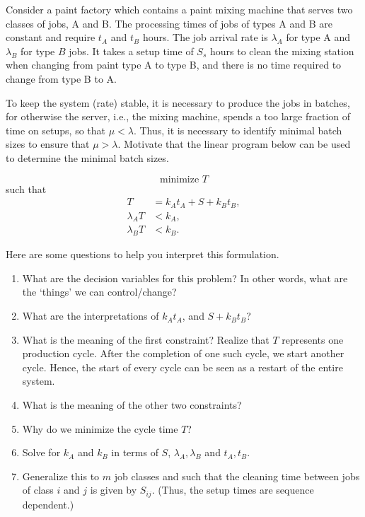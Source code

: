 \begin{question}
  Consider a paint factory which contains a paint mixing machine that
  serves two classes of jobs, A and B. The processing times of jobs of
  types A and B are constant and require $t_A$ and $t_B$ hours. The
  job arrival rate is $\lambda_A$ for type A and $\lambda_B$ for type
  $B$ jobs. It takes a setup time of $S_s$ hours to clean the mixing
  station when changing from paint type A to type B, and there is no
  time required to change from type B to A.

  To keep the system (rate) stable, it is necessary to produce the
  jobs in batches, for otherwise the server, i.e., the mixing machine,
  spends a too large fraction of time on setups, so that
  $\mu < \lambda$. Thus, it is necessary to identify minimal batch
  sizes to ensure that $\mu > \lambda$.  Motivate that the linear
  program below can be used to determine the minimal batch sizes.

\begin{equation*}
  \text{minimize }  T
\end{equation*}
such that
\begin{align*}
 T&=  k_A t_A + S + k_B t_B, \\
 \lambda_A T &< k_A,  \\
 \lambda_B T &< k_B.
\end{align*}

\begin{hint}
Here are some questions to help you interpret this formulation.
\begin{enumerate}
\item   What are the decision variables for this problem? In other words, what are the `things' we can control/change?
\item What are the interpretations of $k_A t_A$, and $S+k_B t_B$?
\item What is the meaning of the first constraint?  Realize that $T$
  represents one production cycle. After the completion of one such
  cycle, we start another cycle. Hence, the start of every cycle can
  be seen as a restart of the entire system.
\item   What is the meaning of the other two constraints?
\item Why do we minimize the cycle time $T$?
\item Solve for $k_A$ and $k_B$ in terms of $S$,  $\lambda_A, \lambda_B$ and $t_A, t_B$. 
\item Generalize this to $m$ job classes and such that the cleaning
  time between jobs of class $i$ and $j$ is given by $S_{ij}$. (Thus,
  the setup times are sequence dependent.) 
\end{enumerate}
\end{hint}


\end{question}
